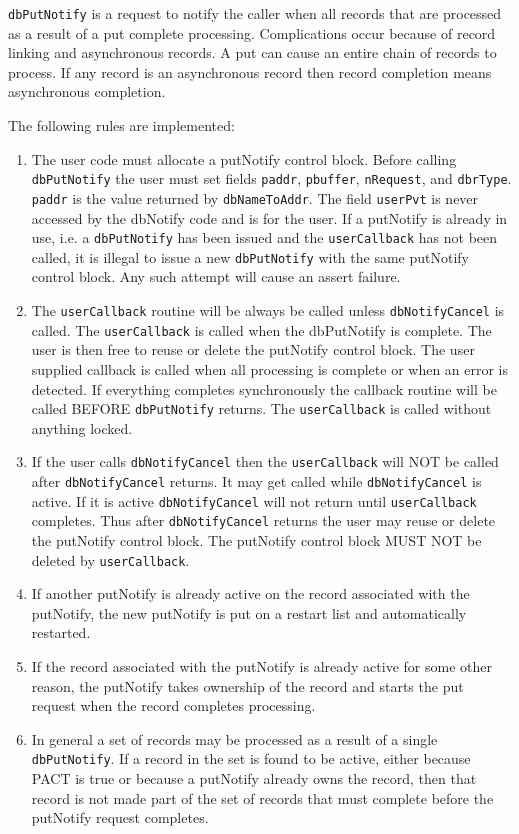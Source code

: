 \verb|dbPutNotify| is a request to notify the caller when all records that are processed as a result of a put complete processing.
Complications occur because of record linking and asynchronous records.
A put can cause an entire chain of records to process.
If any record is an asynchronous record then record completion means asynchronous completion.

The following rules are implemented:

\begin{enumerate}
\item The user code must allocate a putNotify control block.
Before calling \verb|dbPutNotify| the user must set fields \verb|paddr|, \verb|pbuffer|, \verb|nRequest|, and \verb|dbrType|.
\verb|paddr| is the value returned by \verb|dbNameToAddr|.
The field \verb|userPvt| is never accessed by the dbNotify code and is for the user.
If a putNotify is already in use, i.e. a \verb|dbPutNotify| has been issued and the \verb|userCallback| has not been called, it is illegal to issue a new \verb|dbPutNotify| with the same putNotify control block.
Any such attempt will cause an assert failure.

\item The \verb|userCallback| routine will be always be called unless \verb|dbNotifyCancel| is called.
The \verb|userCallback| is called when the dbPutNotify is complete.
The user is then free to reuse or delete the putNotify control block.
The user supplied callback is called when all processing is complete or when an error is detected.
If everything completes synchronously the callback routine will be called BEFORE \verb|dbPutNotify| returns.
The \verb|userCallback| is called without anything locked.

\item If the user calls \verb|dbNotifyCancel| then the \verb|userCallback| will NOT be called after \verb|dbNotifyCancel| returns.
It may get called while \verb|dbNotifyCancel| is active.
If it is active \verb|dbNotifyCancel| will not return until \verb|userCallback| completes.
Thus after \verb|dbNotifyCancel| returns the user may reuse or delete the putNotify control block.
The putNotify control block MUST NOT be deleted by \verb|userCallback|.

\item If another putNotify is already active on the record associated with the putNotify, the new putNotify is put on a restart list and automatically restarted.

\item If the record associated with the putNotify is already active for some other reason, the putNotify takes ownership of the record and starts the put request when the record completes processing.

\item In general a set of records may be processed as a result of a single \verb|dbPutNotify|.
If a record in the set is found to be active, either because PACT is true or because a putNotify already owns the record, then that record is not made part of the set of records that must complete before the putNotify request completes.

\end{enumerate}

